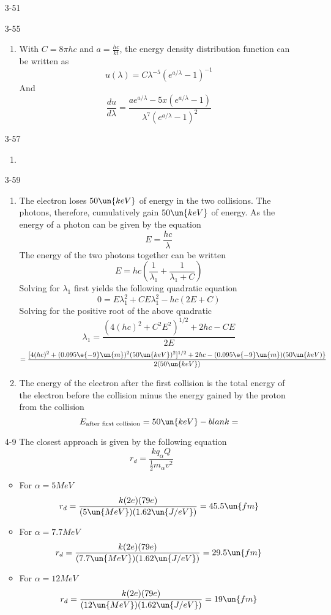 \documentclass{2620hw}
\begin{document}
\begin{enumerate}
\begin{enumerate}
\end{enumerate}

\item [3-51]


\item [3-55]
\begin{enumerate}
    \item With $C = 8\pi hc$ and $a = \frac{hc}{kt}$, the energy density distribution function can be written as 
	\[
		u(\lambda) = C \lambda^{-5} ( e^{a/\lambda} - 1)^{-1}
	\]
	And 
	\[
		\frac{du}{d\lambda} = \frac{a e^{a/\lambda} - 5x(e^{a/\lambda} - 1)}{\lambda^7(e^{a/\lambda}-1)^2}
	\]
\end{enumerate}

\item [3-57]
\begin{enumerate}
    \item 
\end{enumerate}

\item [3-59]
\begin{enumerate}
    \item The electron loses $50\un{keV}$ of energy in the two collisions. The photons, therefore, cumulatively gain $50\un{keV}$ of energy. As the energy of a photon can be given by the equation 
	\[
		E = \frac{hc}{\lambda}
	\]
	The energy of the two photons together can be written 
	\[
		E = hc \left( \frac{1}{\lambda_1} + \frac{1}{\lambda_1 + C} \right)
	\]
	Solving for $\lambda_1$ first yields the following quadratic equation
	\[
		0 = E\lambda_1^2 + CE\lambda_1^2 - hc(2E + C)
	\]
	Solving for the positive root of the above quadratic
	\[
		\lambda_1 = \frac{ (4(hc)^2 + C^2E^2)^{1/2} + 2hc - CE}{2E}
	\]
	\[
		= \frac{ [4(hc)^2 + (0.095\e{-9}\un{m})^2(50\un{keV})^2]^{1/2} + 2hc - (0.095\e{-9}\un{m})(50\un{keV)}}{2(50\un{keV})}
	\]
	
	\item The energy of the electron after the first collision is the total energy of the electron before the collision minus the energy gained by the proton from the collision
	\[
		E_{\text{after first collision}} = 50\un{keV} - blank = 
	\]
	
\end{enumerate}

\item [4-9] The closest approach is given by the following equation
\[
	r_d = \frac{kq_{\alpha}Q}{\frac{1}{2}m_{\alpha}v^2}	
\]
\begin{itemize}
	\item For $\alpha = 5MeV$
	\[
		r_d = \frac{k(2e)(79e)}{(5\un{MeV})(1.62\un{J/eV})} = 45.5 \un{fm}
	\]		
	\item For $\alpha = 7.7MeV$
	\[
		r_d = \frac{k(2e)(79e)}{(7.7\un{MeV})(1.62\un{J/eV})} = 29.5 \un{fm}
	\]
	\item For $\alpha = 12MeV$
	\[
	r_d = \frac{k(2e)(79e)}{(12\un{MeV})(1.62\un{J/eV})} = 19 \un{fm}
	\]
\end{itemize}

\end{enumerate}
\end{document}
